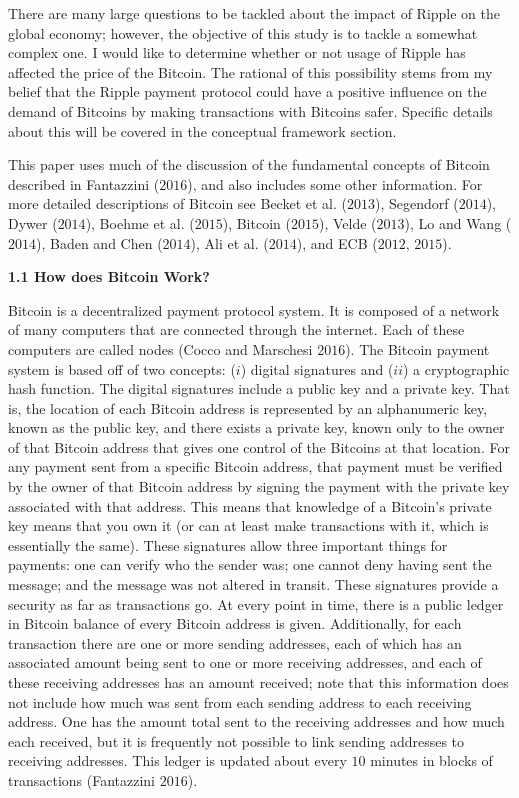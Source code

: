 \documentclass{article}[10 pt]
\newcommand{\vs}{\vspace{0.1in}}
\begin{document}
\vs

There are many large questions to be tackled about the impact of Ripple on
the global economy; however, the objective of this study is to tackle a
somewhat complex one. I would like to determine whether or not usage of
Ripple has affected the price of the Bitcoin. The rational of this
possibility stems from my belief that the Ripple payment protocol could have
a positive influence on the demand of Bitcoins by making transactions with
Bitcoins safer. Specific details about this will be covered in the
conceptual framework section.

\vs

This paper uses much of the discussion of the fundamental concepts of
Bitcoin described in Fantazzini ($2016$), and also includes some other
information. For more detailed descriptions of Bitcoin see Becket et al.
($2013$), Segendorf ($2014$), Dywer ($2014$), Boehme et al. ($2015$),
Bitcoin ($2015$), Velde ($2013$), Lo and Wang ($2014$), Baden and Chen
($2014$), Ali et al. ($2014$), and ECB ($2012$, $2015$).

\vs

\textbf{1.1 How does Bitcoin Work?}

\vs

Bitcoin is a decentralized payment protocol system. It is composed of a
network of many computers that are connected through the internet. Each of
these computers are called nodes (Cocco and Marschesi $2016$).
The Bitcoin payment system is based off of two concepts: ($i$) digital
signatures and ($ii$) a cryptographic hash function. The digital signatures
include a public key and a private key. That is, the location of each
Bitcoin address is represented by an alphanumeric key, known as the public
key, and there exists a private key, known only to the owner of that Bitcoin
address that gives one control of the Bitcoins at that location. For any
payment sent from a specific Bitcoin address, that payment must be verified by
the owner of that Bitcoin address by signing the payment with the private
key associated with that address. This means that knowledge of a Bitcoin's
private key means that you own it (or can at least make transactions with
it, which is essentially the same). These signatures allow three important
things for payments: one can verify who the sender was; one cannot deny 
having sent the message; and the message was not altered in transit. These
signatures provide a security as far as transactions go. At every point in
time, there is a public ledger in Bitcoin balance of every Bitcoin address
is given. Additionally, for each transaction there are one or more sending 
addresses, each of which has an associated amount being sent to one or more
receiving addresses, and each of these receiving addresses has an amount
received; note that this information does not include how much was sent from
each sending address to each receiving address. One has the amount total
sent to the receiving addresses and how much each received, but it is frequently 
not possible to link sending addresses to receiving addresses.
This ledger is updated about every $10$ minutes in blocks of transactions
(Fantazzini $2016$).
\end{document}

